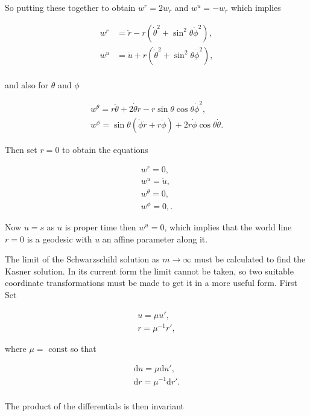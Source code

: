 \noindent So putting these together to obtain $w^{r} = 2w_{r}$ and $w^{u} = -w_{r}$ which implies

\begin{align*}
w^{r} & = \ddot{r} - r(\dot{\theta}^2 + \sin^2{\theta}\dot{\phi}^2), \\
w^{u} & = \ddot{u} + r(\dot{\theta}^2 + \sin^2{\theta}\dot{\phi}^2), \\
\end{align*}

\noindent and also for $\theta$ and $\phi$

\begin{align*}
w^{\theta} = r \ddot{\theta} + 2 \dot{\theta} \dot{r} - r \sin{\theta}\cos{\theta}\dot{\phi}^2, \\
w^{\phi} = \sin{\theta}(\dot{\phi} \dot{r} + r \ddot{\phi}) + 2r \dot{\phi}\cos{\theta} \dot{\theta}.
\end{align*}

\noindent Then set $r=0$ to obtain the equations

\begin{align*} 
w^{r} = 0, \\
w^{u} = \ddot{u}, \\
w^{\theta} = 0, \\
w^{\phi} = 0,.
\end{align*} 

\noindent Now $u = s$ as $u$ is proper time then $w^{u} = 0$, which implies that the world line $r=0$ is a geodesic with $u$ an affine parameter along it. 

The limit of the Schwarzschild solution as $m \rightarrow \infty$ must be calculated to find the Kasner solution. In its current form the limit cannot be taken, so two suitable coordinate transformations must be made to get it in a more useful form. First Set 

\begin{gather*} 
u = \mu u', \\
r = {\mu}^{-1} r',   
\end{gather*} 

\noindent where $\mu = \text{ const}$ so that
  
\begin{gather*} 
\mathrm{d}u = \mu \mathrm{d}u', \\
\mathrm{d}r = {\mu}^{-1} \mathrm{d}r'. \\
\end{gather*} 

\noindent The product of the differentials is then invariant

